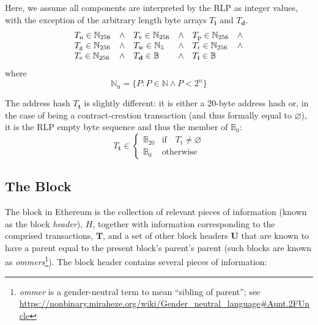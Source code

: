 \documentclass[9pt,oneside]{amsart}
\makeatletter
\newcommand{\linkdest}[1]{\Hy@raisedlink{\hypertarget{#1}{}}}
\makeatother
\begin{document}
\begin{multicols}{2}
Here, we assume all components are interpreted by the RLP as integer values, with the exception of the arbitrary length byte arrays $T_{\mathbf{i}}$ and $T_{\mathbf{d}}$.
\begin{equation}
\begin{array}[t]{lclclc}
T_{\mathrm{n}} \in \mathbb{N}_{256} & \wedge & T_{\mathrm{v}} \in \mathbb{N}_{256} & \wedge & T_{\mathrm{p}} \in \mathbb{N}_{256} & \wedge \\
T_{\mathrm{g}} \in \mathbb{N}_{256} & \wedge & T_{\mathrm{w}} \in \mathbb{N}_5 & \wedge & T_{\mathrm{r}} \in \mathbb{N}_{256} & \wedge \\
T_{\mathrm{s}} \in \mathbb{N}_{256} & \wedge & T_{\mathbf{d}} \in \mathbb{B} & \wedge & T_{\mathbf{i}} \in \mathbb{B}
\end{array}
\end{equation}
where
\begin{equation}
\mathbb{N}_{\mathrm{n}} = \{ P: P \in \mathbb{N} \wedge P < 2^n \}
\end{equation}

The address hash $T_{\mathbf{t}}$ is slightly different: it is either a 20-byte address hash or, in the case of being a contract-creation transaction (and thus formally equal to $\varnothing$), it is the RLP empty byte sequence and thus the member of $\mathbb{B}_0$:
\begin{equation}
T_{\mathbf{t}} \in \begin{cases} \mathbb{B}_{20} & \text{if} \quad T_{\mathrm{t}} \neq \varnothing \\
\mathbb{B}_{0} & \text{otherwise}\end{cases}
\end{equation}

\subsection{The Block}\linkdest{block}\label{subsec:The_Block}

The block in Ethereum is the collection of relevant pieces of information (known as the block \textit{header}), $H$, together with information corresponding to the comprised transactions, $\mathbf{T}$,\hypertarget{ommerheaders}{} and a set of other block headers $\mathbf{U}$ that are known to have a parent equal to the present block's parent's parent (such blocks are known as \textit{ommers}\footnote{\textit{ommer} is a gender-neutral term to mean ``sibling of parent''; see \url{https://nonbinary.miraheze.org/wiki/Gender_neutral_language\#Aunt.2FUncle}}). The block header contains several pieces of information:


\end{multicols}
\end{document}
